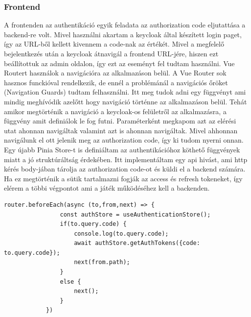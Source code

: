\documentclass[a4paper,twoside]{article}
\begin{document}
\subsubsection{Frontend}
A frontenden az authentikáció egyik feladata az authorization code eljutattása a backend-re volt. Mivel használni akartam a keycloak által 
készített login paget, így az URL-ből kellett kivennem a code-nak az értékét. Mivel a megfelelő bejelentkezés után a keycloak átnavigál a frontend 
URL-jére, hiszen ezt beállítottuk az admin oldalon, így ezt az eseményt fel tudtam használni. Vue Routert használok a navigációra az alkalmazáson belül. A Vue Router 
sok hasznos funckióval rendelkezik, de ennél a problémánál a navigációs őröket (Navigation Guards) tudtam felhasználni. Itt meg tudok adni egy függvényt ami
mindig meghívódik azelőtt hogy navigáció történne az alkalmazáson belül. Tehát amikor megtörténik a navigáció a keycloak-os felületről az alkalmazásra, a függvény amit 
definiálok le fog futni. Paraméterként megkapom azt az elérési utat ahonnan navigáltak valamint azt is ahonnan navigáltak. Mivel ahhonnan navigálunk el ott jelenik meg az
authorization code, így ki tudom nyerni onnan. Egy újabb Pinia Store-t is definiáltam az authentikációhoz köthető függvények miatt a jó struktúráltság érdekében. Itt implementáltam egy api hivást, ami http kérés body-jában tárolja az authorization code-ot és küldi el a backend számára. Ha ez megtörténik a sütik tartalmazni fogják az access és refresh tokeneket, így elérem a többi végpontot ami a játék működéséhez kell a backenden. 
\begin{adjustwidth}{0cm}{0cm}
	\begin{minipage}{\textwidth}
		\begin{lstlisting}[style=javascriptStyle,caption={Authorization code kinyerése az elnavigált URL-ből}]
			router.beforeEach(async (to,from,next) => {
				const authStore = useAuthenticationStore();
				if(to.query.code) {
					console.log(to.query.code);
					await authStore.getAuthTokens({code: to.query.code});
					next(from.path);
				}
				else {
					next();
				}
			})
		\end{lstlisting}
	\end{minipage}
\end{adjustwidth}

\newpage
\end{document}
